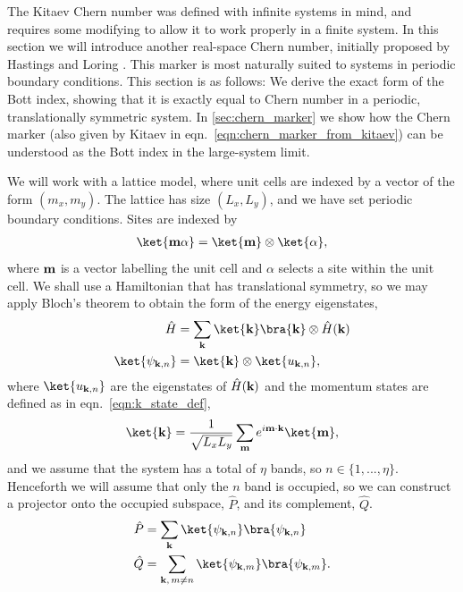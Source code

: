 The Kitaev Chern number was defined with infinite systems in mind, and requires some modifying to allow it to work properly in a finite system. In this section we will introduce another real-space Chern number, initially proposed by Hastings and Loring \cite{hastings_almost_2010,hastings_topological_2011}. This marker is most naturally suited to systems in periodic boundary conditions. This section is as follows: We derive the exact form of the Bott index, showing that it is exactly equal to Chern number in a periodic, translationally symmetric system. In \textsection\ref{sec:chern_marker} we show how the Chern marker \cite{bianco_mapping_2011} (also given by Kitaev in eqn.~\ref{eqn:chern_marker_from_kitaev}) can be understood as the Bott index in the large-system limit.

We will work with a lattice model, where unit cells are indexed by a vector of the form $(m_x,m_y)$. The lattice has size $(L_x,L_y)$, and we have set periodic boundary conditions. Sites are indexed by 
\begin{align}
	\ket{\textbf m \alpha} = \ket{\textbf m} \otimes \ket{\alpha},
\end{align} 
where $\textbf m$ is a vector labelling the unit cell and $\alpha$ selects a site within the unit cell. We shall use a Hamiltonian that has translational symmetry, so we may apply Bloch's theorem to obtain the form of the energy eigenstates,
\begin{align}
	\hat H &= \sum_{\textbf k} \ket{\textbf k}\bra{\textbf k}\otimes \hat H(\textbf k) \\ 
	\ket{\psi_{\textbf k, n}} &= \ket{\textbf k} \otimes\ket {u_{\textbf k, n}},
\end{align}
where $\ket {u_{\textbf k, n}}$ are the eigenstates of $\hat H(\textbf k)$ and the momentum states are defined as in eqn.~\ref{eqn:k_state_def},
\begin{align}
	\ket{\textbf k} = \frac{1}{\sqrt{L_x L_y}} \sum_{\textbf m} e^{i \textbf m \cdot \textbf k} \ket {\textbf m},
\end{align}
and we assume that the system has a total of $\eta$ bands, so $n \in  \{1,...,\eta\}$. Henceforth we will assume that only the $n$ band is occupied, so we can construct a projector onto the occupied subspace, $\hat P$, and its complement, $\hat Q$.
\begin{align}
	\hat P & = \sum_{\textbf k} \ket{\psi_{\textbf k, n}}\bra{\psi_{\textbf k, n}} \\
	\hat Q & = \sum_{\textbf k,\, m \neq n} \ket{\psi_{\textbf k, m}}\bra{\psi_{\textbf k, m}}.
\end{align}
